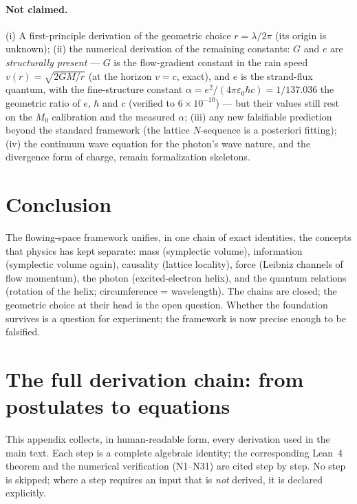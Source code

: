 \documentclass[aps,prd,preprint,superscriptaddress,amsmath,amssymb]{revtex4-2}
\begin{document}
\paragraph{Not claimed.} (i) A first-principle derivation of the
geometric choice $r=\lambda/2\pi$ (its origin is unknown); (ii) the
numerical derivation of the remaining constants: $G$ and $e$ are
\emph{structurally present} --- $G$ is the flow-gradient constant in the
rain speed $v(r)=\sqrt{2GM/r}$ (at the horizon $v=c$, exact), and $e$ is
the strand-flux quantum, with the fine-structure constant
$\alpha=e^2/(4\pi\varepsilon_0\hbar c)=1/137.036$ the geometric ratio of
$e$, $\hbar$ and $c$ (verified to $6\times10^{-10}$) --- but their values
still rest on the $M_0$ calibration and the measured $\alpha$; (iii) any
new falsifiable prediction beyond the standard framework (the lattice
$N$-sequence is a posteriori fitting); (iv) the continuum wave equation
for the photon's wave nature, and the divergence form of charge, remain
formalization skeletons.

\section{Conclusion}
\label{sec:conclusion}

The flowing-space framework unifies, in one chain of exact identities,
the concepts that physics has kept separate: mass (symplectic volume),
information (symplectic volume again), causality (lattice locality),
force (Leibniz channels of flow momentum), the photon (excited-electron
helix), and the quantum relations (rotation of the helix; circumference =
wavelength).  The chains are closed; the geometric choice at their head
is the open question.  Whether the foundation survives is a question for
experiment; the framework is now precise enough to be falsified.

\appendix
\section{The full derivation chain: from postulates to equations}
\label{app:derivations}

This appendix collects, in human-readable form, every derivation used in
the main text.  Each step is a complete algebraic identity; the
corresponding Lean~4 theorem \cite{de2015lean} and the
numerical verification (N1--N31) are cited step by step.  No step is
skipped; where a step requires an input that is \emph{not} derived, it is
declared explicitly.
\end{document}
